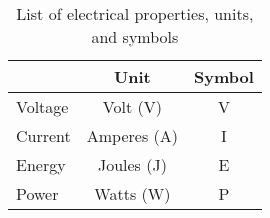 \begin{table}[H]
\centering
\begin{tabular}{l|c|c|}
\cline{2-3}
                              & Unit        & Symbol \\ \hline
\multicolumn{1}{|l|}{Voltage} & Volt (V)    & V      \\
\multicolumn{1}{|l|}{Current} & Amperes (A) & I      \\
\multicolumn{1}{|l|}{Energy}  & Joules (J)  & E      \\
\multicolumn{1}{|l|}{Power}   & Watts (W)   & P      \\ \hline
\end{tabular}
\caption{List of electrical properties, units, and symbols}
\end{table}